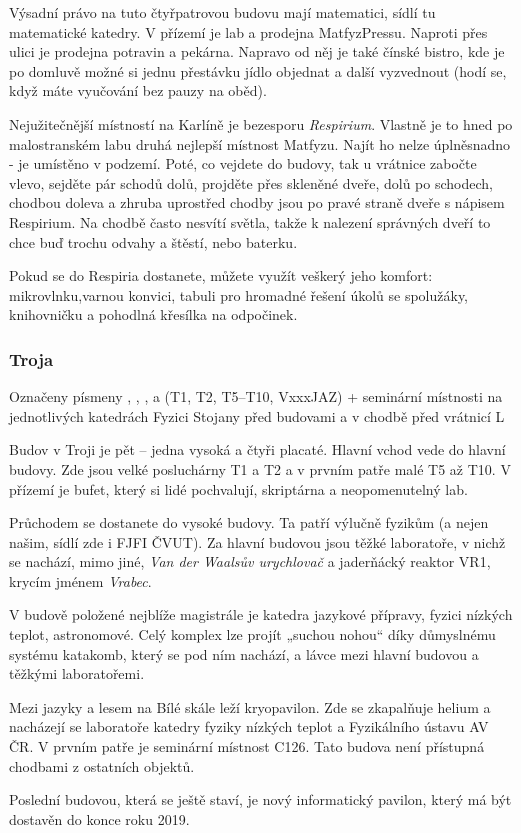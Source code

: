 \noindent Výsadní právo na tuto čtyřpatrovou budovu mají matematici, sídlí
tu matematické katedry. V přízemí je lab a prodejna MatfyzPressu. Naproti
přes ulici je prodejna potravin a pekárna. Napravo od něj je také čínské bistro,
kde je po domluvě možné si jednu přestávku jídlo objednat a další vyzvednout
(hodí se, když máte vyučování bez pauzy na oběd).

Nejužitečnější místností na Karlíně je bezesporu \textit{Respirium}. Vlastně je
to hned po malostranském labu druhá nejlepší místnost Matfyzu. Najít ho nelze
úplněsnadno - je umístěno v podzemí. Poté, co vejdete do budovy, tak u
vrátnice zabočte vlevo, sejděte pár schodů dolů, projděte přes skleněné dveře,
dolů po schodech, chodbou doleva a zhruba uprostřed chodby jsou po pravé straně
dveře s nápisem Respirium. Na chodbě často nesvítí světla, takže k nalezení
správných dveří to chce buď trochu odvahy a štěstí, nebo baterku.

Pokud se do Respiria dostanete, můžete využít veškerý jeho komfort:
mikrovlnku,varnou konvici, tabuli pro hromadné řešení úkolů se spolužáky,
knihovničku a pohodlná křesílka na odpočinek.


\subsubsection{Troja}

{Označeny písmeny , , ,  a  (T1, T2, T5--T10,
VxxxJAZ) + seminární místnosti na
jednotlivých katedrách}
{Fyzici}
{Stojany před budovami a v chodbě před vrátnicí L}

\noindent Budov v Troji je pět – jedna vysoká a čtyři placaté.
Hlavní vchod vede do hlavní budovy. Zde jsou velké posluchárny T1 a T2 a v prvním patře malé T5 až T10.
V přízemí je bufet, který si lidé pochvalují, skriptárna a neopomenutelný lab.

Průchodem se dostanete do vysoké budovy. Ta patří výlučně fyzikům (a nejen našim,
sídlí zde i FJFI ČVUT).
Za hlavní budovou jsou těžké laboratoře, v nichž se nachází, mimo jiné,
\textit{Van der Waalsův urychlovač} a jaderňácký reaktor VR1, krycím jménem
\textit{Vrabec}.

V budově položené nejblíže magistrále je katedra jazykové přípravy,
fyzici nízkých teplot, astronomové. Celý komplex lze projít „suchou
nohou“ díky důmyslnému systému katakomb, který se pod ním nachází, a lávce mezi
hlavní budovou a těžkými laboratořemi.

Mezi jazyky a lesem na Bílé skále leží kryopavilon. Zde se zkapalňuje helium a nacházejí se
laboratoře katedry fyziky nízkých teplot a Fyzikálního ústavu AV ČR. V prvním
patře je seminární místnost C126. Tato budova není přístupná chodbami
z ostatních objektů.

Poslední budovou, která se ještě staví, je nový informatický pavilon, který má být dostavěn do konce roku 2019.